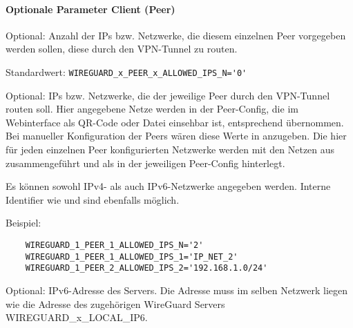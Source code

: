 \paragraph{Optionale Parameter Client (Peer)}

\begin{description}


Optional: Anzahl der IPs bzw. Netzwerke, die diesem einzelnen Peer vorgegeben werden sollen, diese durch den
VPN-Tunnel zu routen.

Standardwert: \verb+WIREGUARD_x_PEER_x_ALLOWED_IPS_N='0'+



Optional: IPs bzw. Netzwerke, die der jeweilige Peer durch den
VPN-Tunnel routen soll. Hier angegebene Netze werden in der
Peer-Config, die im Webinterface als QR-Code oder Datei einsehbar ist,
entsprechend übernommen. Bei manueller Konfiguration der Peers wären
diese Werte in  anzugeben.  Die hier für jeden
einzelnen Peer konfigurierten Netzwerke werden mit den Netzen aus
 zusammengeführt und als
 in der jeweiligen Peer-Config hinterlegt.

Es können sowohl IPv4- als auch IPv6-Netzwerke angegeben werden. Interne Identifier wie  und
 sind ebenfalls möglich.

Beispiel:

\begin{example}
\begin{verbatim}
    WIREGUARD_1_PEER_1_ALLOWED_IPS_N='2'
    WIREGUARD_1_PEER_1_ALLOWED_IPS_1='IP_NET_2'
    WIREGUARD_1_PEER_2_ALLOWED_IPS_2='192.168.1.0/24'
\end{verbatim}
\end{example}



Optional: IPv6-Adresse des Servers. Die Adresse muss im selben
Netzwerk liegen wie die Adresse des zugehörigen WireGuard Servers
WIREGUARD\_x\_LOCAL\_IP6.




\end{description}
